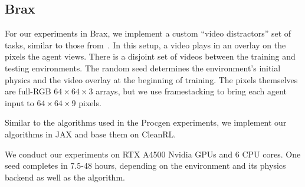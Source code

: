 \subsection{Brax}
For our experiments in Brax, we implement a custom ``video distractors'' set of tasks, similar to those from~\citep{DistractingDM}. In this setup, a video plays in an overlay on the pixels the agent views. There is a disjoint set of videos between the training and testing environments. The random seed determines the environment's initial physics and the video overlay at the beginning of training. The pixels themselves are full-RGB $64\times64\times3$ arrays, but we use framestacking to bring each agent input to $64\times64\times9$ pixels.

Similar to the algorithms used in the Procgen experiments, we implement our algorithms in JAX and base them on CleanRL.

We conduct our experiments on RTX A4500 Nvidia GPUs and 6 CPU cores. One seed completes in 7.5-48 hours, depending on the environment and its physics backend as well as the algorithm.

